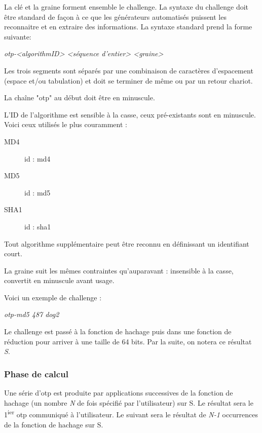\documentclass{../res/univ-projet}
\begin{document}
      La clé et la graine forment ensemble le challenge. La syntaxe du challenge
doit être standard de façon à ce que les générateurs automatisés puissent les 
reconnaitre et en extraire des informations. La syntaxe standard prend la forme 
suivante:
      \begin{center}
          \emph{otp-<algorithmID> <séquence d'entier> <graine>}\\
      \end{center}

      Les trois segments sont séparés par une combinaison de caractères 
d'espacement (espace et/ou tabulation) et doit se terminer de même ou par un 
retour chariot. 

      La chaîne "otp" au début doit être en minuscule.

      L'ID de l'algorithme est sensible à la casse, ceux pré-existants sont en 
      minuscule. Voici ceux utilisés le plus couramment :
      \begin{description}
          \item [MD4] id : md4
          \item [MD5] id : md5
          \item [SHA1] id : sha1 
      \end{description}
      Tout algorithme supplémentaire peut être reconnu en définissant un 
identifiant court.

      La graine suit les mêmes contraintes qu'auparavant : insensible à la 
    casse, convertit en minuscule avant usage.

      Voici un exemple de challenge :
      \begin{center}
          \emph{otp-md5 487 dog2 }\\ 
      \end{center}

      Le challenge est passé à la fonction de hachage puis dans une fonction
      de réduction pour arriver à une taille de 64 bits. Par la suite,
      on notera ce résultat \emph{S}.

    \subsubsection{Phase de calcul}
      Une série d'otp est produite par applications successives de la fonction de 
hachage (un nombre \emph{N} de fois spécifié par l'utilisateur) sur S. Le 
résultat sera le 1\textsuperscript{ier} otp communiqué à l'utilisateur. Le 
suivant sera le résultat de \emph{N-1} occurrences de la fonction de hachage 
sur S. 
\end{document}
